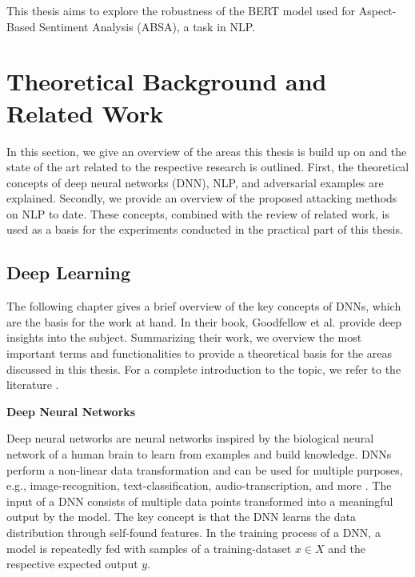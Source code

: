 This thesis aims to explore the robustness of the BERT model used for Aspect-Based Sentiment Analysis (ABSA), a task in NLP. 



\section{Theoretical Background and Related Work}

In this section, we give an overview of the areas this thesis is build up on and the state of the art related to the respective research is outlined. First, the theoretical concepts of deep neural networks (DNN), NLP, and adversarial examples are explained. Secondly, we provide an overview of the proposed attacking methods on NLP to date. These concepts, combined with the review of related work, is used as a basis for the experiments conducted in the practical part of this thesis. 

\subsection{Deep Learning}
The following chapter gives a brief overview of the key concepts of DNNs, which are the basis for the work at hand. In their book, Goodfellow et al. provide deep insights into the subject. Summarizing their work, we overview the most important terms and functionalities to provide a theoretical basis for the areas discussed in this thesis. For a complete introduction to the topic, we refer to the literature \cite{bengio2017deep}. 

\textbf{Deep Neural Networks}

Deep neural networks are neural networks inspired by the biological neural network of a human brain to learn from examples and build knowledge. 
DNNs perform a non-linear data transformation and can be used for multiple purposes, e.g., image-recognition, text-classification, audio-transcription, and more \cite{rawat2017deep}.
The input of a DNN consists of multiple data points transformed into a meaningful output by the model. The key concept is that the DNN learns the data distribution through self-found features.
In the training process of a DNN, a model is repeatedly fed with samples of a training-dataset $x \in X$ and the respective expected output $y$.

